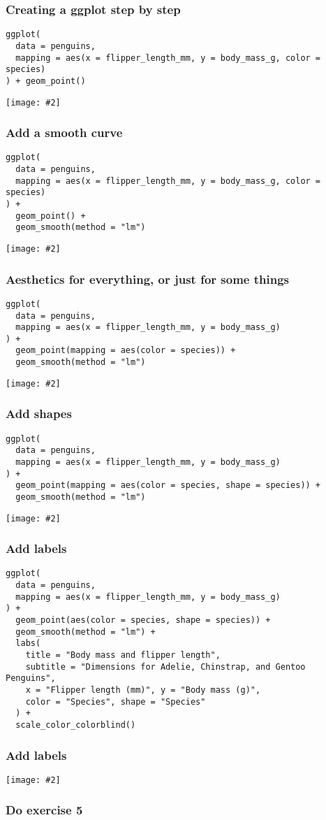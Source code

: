 \documentclass{beamer}
\newcommand{\fig}[2]{\centerline{\texttt{[image: \#2]}}}
\newcommand{\bfr}[1]{\begin{frame}[fragile]\frametitle{{ #1 }}}
\begin{document}
\bfr{Creating a ggplot step by step}\scriptsize
\begin{verbatim}
ggplot(
  data = penguins,
  mapping = aes(x = flipper_length_mm, y = body_mass_g, color = species)
) + geom_point()
\end{verbatim}
\fig{.8}{unnamed-chunk-11-1.png}

\end{frame}


\bfr{Add a smooth curve}\scriptsize
\begin{verbatim}
ggplot(
  data = penguins,
  mapping = aes(x = flipper_length_mm, y = body_mass_g, color = species)
) +
  geom_point() +
  geom_smooth(method = "lm")
\end{verbatim}
\fig{.8}{unnamed-chunk-12-1.png}

\end{frame}


\bfr{Aesthetics for everything, or just for some things}\scriptsize
\begin{verbatim}
ggplot(
  data = penguins,
  mapping = aes(x = flipper_length_mm, y = body_mass_g)
) +
  geom_point(mapping = aes(color = species)) +
  geom_smooth(method = "lm")
\end{verbatim}
\fig{.8}{unnamed-chunk-13-1.png}

\end{frame}


\bfr{Add shapes}\scriptsize
\begin{verbatim}
ggplot(
  data = penguins,
  mapping = aes(x = flipper_length_mm, y = body_mass_g)
) +
  geom_point(mapping = aes(color = species, shape = species)) +
  geom_smooth(method = "lm")
\end{verbatim}
\fig{.8}{unnamed-chunk-14-1.png}

\end{frame}


\bfr{Add labels}\scriptsize
\begin{verbatim}
ggplot(
  data = penguins,
  mapping = aes(x = flipper_length_mm, y = body_mass_g)
) +
  geom_point(aes(color = species, shape = species)) +
  geom_smooth(method = "lm") +
  labs(
    title = "Body mass and flipper length",
    subtitle = "Dimensions for Adelie, Chinstrap, and Gentoo Penguins",
    x = "Flipper length (mm)", y = "Body mass (g)",
    color = "Species", shape = "Species"
  ) +
  scale_color_colorblind()
\end{verbatim}
\end{frame}
\bfr{Add labels}
\fig{1}{unnamed-chunk-15-1.png}

\end{frame}

\bfr{Do exercise 5}
\end{frame}
\end{document}
